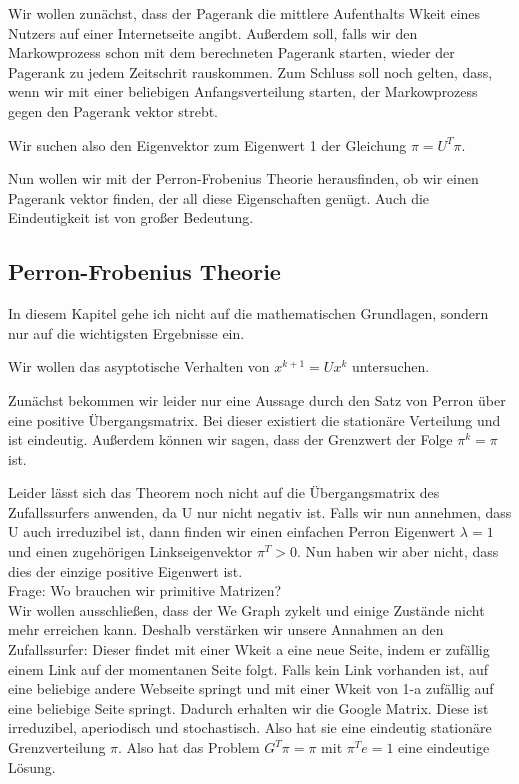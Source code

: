 \documentclass[]{article}
\begin{document}
Wir wollen zunächst, dass der Pagerank die mittlere Aufenthalts Wkeit eines Nutzers auf einer Internetseite angibt. Außerdem soll, falls wir den Markowprozess schon mit dem berechneten Pagerank starten, wieder der Pagerank zu jedem Zeitschrit rauskommen. Zum Schluss soll noch gelten, dass, wenn wir mit einer beliebigen Anfangsverteilung starten, der Markowprozess gegen den Pagerank vektor strebt. 

Wir suchen also den Eigenvektor zum Eigenwert 1 der Gleichung $\pi = U^T \pi$. 

Nun wollen wir mit der Perron-Frobenius Theorie herausfinden, ob wir einen Pagerank vektor finden, der all diese Eigenschaften genügt. Auch die Eindeutigkeit ist von großer Bedeutung.

\subsection{Perron-Frobenius Theorie}

In diesem Kapitel gehe ich nicht auf die mathematischen Grundlagen, sondern nur auf die wichtigsten Ergebnisse ein. 

Wir wollen das asyptotische Verhalten von $x^{k+1}=U x^k$ untersuchen. 

Zunächst bekommen wir leider nur eine Aussage durch den Satz von Perron über eine positive Übergangsmatrix. Bei dieser existiert die stationäre Verteilung und ist eindeutig. Außerdem können wir sagen, dass der Grenzwert der Folge $\pi^k=\pi$ ist. 

Leider lässt sich das Theorem noch nicht auf die Übergangsmatrix des Zufallssurfers anwenden, da U nur nicht negativ ist. Falls wir nun annehmen, dass U auch irreduzibel ist, dann finden wir einen einfachen Perron Eigenwert $\lambda = 1$ und einen zugehörigen Linkseigenvektor $\pi^T>0$. Nun haben wir aber nicht, dass dies der einzige positive Eigenwert ist. \\

Frage: Wo brauchen wir primitive Matrizen? \\
  
Wir wollen ausschließen, dass der We Graph zykelt und einige Zustände nicht mehr erreichen kann. Deshalb verstärken wir unsere Annahmen an den Zufallssurfer: Dieser findet mit einer Wkeit a eine neue Seite, indem er zufällig einem Link auf der momentanen Seite folgt. Falls kein Link vorhanden ist, auf eine beliebige andere Webseite springt und mit einer Wkeit von 1-a zufällig auf eine beliebige Seite springt. Dadurch erhalten wir die Google Matrix. Diese ist irreduzibel, aperiodisch und stochastisch. Also hat sie eine eindeutig stationäre Grenzverteilung $\pi$. Also hat das Problem $G^T \pi = \pi$ mit $\pi^Te = 1$ eine eindeutige Lösung.    
 
\end{document}
